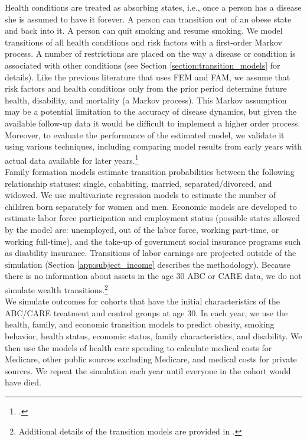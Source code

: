 \noindent Health conditions are treated as absorbing states, i.e., once a person has a disease she is assumed to have it forever. A person can transition out of an obese state and back into it. A person can quit smoking and resume smoking. We model transitions of all health conditions and risk factors with a first-order Markov process. A number of restrictions are placed on the way a disease or condition is associated with other conditions (see Section \ref{section:transition_models} for details). Like the previous literature that uses FEM and FAM, we assume that risk factors and health conditions only from the prior period determine future health, disability, and mortality (a Markov process). This Markov assumption may be a potential limitation to the accuracy of disease dynamics, but given the available follow-up data it would be difficult to implement a higher order process. Moreover, to evaluate the performance of the estimated model, we validate it using various techniques, including comparing model results from early years with actual data available for later years.\footnote{\citet{Goldman_etal_2015_Future-America-Model}.} \\

\noindent Family formation models estimate transition probabilities between the following relationship statuses:  single, cohabiting, married, separated/divorced, and widowed. We use multivariate regression models to estimate the number of children born separately for women and men. Economic models are developed to estimate labor force participation and employment status (possible states allowed by the model are: unemployed, out of the labor force, working part-time, or working full-time), and the take-up of government social insurance programs such as disability insurance. 
Transitions of labor earnings are projected outside of the simulation (Section \ref{app:subject_income} describes the methodology).  Because there is no information about assets in the age 30 ABC or CARE data, we do not simulate wealth transitions.\footnote{Additional details of the transition models are provided in \citet{Goldman_etal_2015_Future-America-Model}.} \\

\noindent We simulate outcomes for cohorts that have the initial characteristics of the ABC/CARE treatment and control groups at age 30. In each year, we use the health, family, and economic transition models to predict obesity, smoking behavior, health status, economic status, family characteristics, and disability. We then use the models of health care spending to calculate medical costs for Medicare, other public sources excluding Medicare, and medical costs for private sources. We repeat the simulation each year until everyone in the cohort would have died. \\

